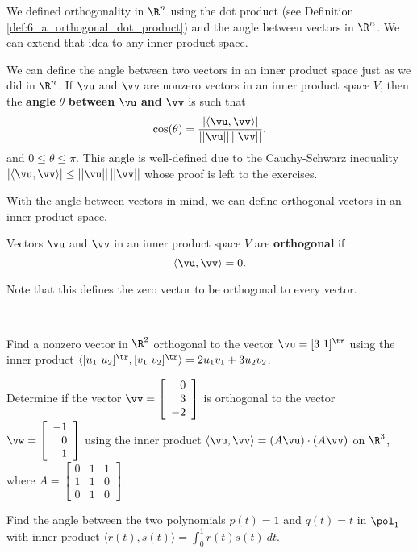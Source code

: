 
We defined orthogonality in $\R^n$ using the dot product (see Definition \ref{def:6_a_orthogonal_dot_product}) and the angle between vectors in $\R^n$. We can extend that idea to any inner product space. 

We can define the angle between two vectors in an inner product space just as we did in $\R^n$. If $\vu$ and $\vv$ are nonzero vectors in an inner product space $V$, then the \textbf{angle} $\theta$ \textbf{between} $\vu$ \textbf{and} $\vv$ is such that 
\[\cos(\theta) = \frac{|\langle \vu, \vv \rangle|}{||\vu||\, ||\vv||}.\]
and $0\leq \theta \leq \pi$. This angle is well-defined due to the Cauchy-Schwarz inequality $|\langle \vu, \vv \rangle| \leq ||\vu||\, ||\vv||$ whose proof is left to the exercises.

With the angle between vectors in mind, we can define orthogonal vectors in an inner product space. 

\begin{definition} Vectors $\vu$ and $\vv$ in an inner product space $V$ are \textbf{orthogonal} if
\[\langle \vu, \vv \rangle = 0.\]
\end{definition}
 
Note that this defines the zero vector to be orthogonal to every vector.

\begin{activity} ~
	\ba
	\item Find a nonzero vector in $\R^2$ orthogonal to the vector $\vu = [3 \ 1]^{\tr}$ using the inner product $\langle [u_1 \ u_2]^{\tr}, [v_1 \ v_2]^{\tr} \rangle = 2u_1v_1 + 3u_2v_2$.
	
	
	
		\item Determine if the vector $\vv = \left[ \begin{array}{r} 0\\3\\-2 \end{array} \right]$ is orthogonal to the vector $\vw = \left[ \begin{array}{r} -1\\0\\1 \end{array} \right]$ using the inner product $\langle \vu, \vv \rangle = (A\vu) \cdot (A\vv)$ on $\R^3$, where $A = \left[ \begin{array}{ccc} 0&1&1\\1&1&0\\0&1&0 \end{array} \right]$.
	
	\item Find the angle between the two polynomials $p(t)=1$ and $q(t)=t$ in $\pol_1$ with inner product $\langle r(t),s(t) \rangle = \int_0^1 r(t)s(t) \ dt$.  	

	\ea
\end{activity}

